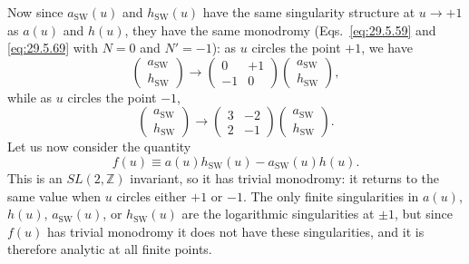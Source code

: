Now since \(a_{\mathrm{SW}}(u)\) and \(h_{\mathrm{SW}}(u)\) have the same
singularity structure at \(u\longrightarrow+1\) as \(a(u)\) and \(h(u)\),
they have the same monodromy (Eqs.~\eqref{eq:29.5.59} and
\eqref{eq:29.5.69} with \(N=0\) and \(N'=-1\)): as \(u\) circles the point
\(+1\), we have
\begin{equation}
  \begin{pmatrix}
    a_{\mathrm{SW}}\\ h_{\mathrm{SW}}
  \end{pmatrix}
  \longrightarrow
  \begin{pmatrix}
    0&+1\\ -1&0
  \end{pmatrix}
  \begin{pmatrix}
    a_{\mathrm{SW}}\\ h_{\mathrm{SW}}
  \end{pmatrix},
  \tag{29.5.81}\label{eq:29.5.81}
\end{equation}
while as \(u\) circles the point \(-1\),
\begin{equation}
  \begin{pmatrix}
    a_{\mathrm{SW}}\\ h_{\mathrm{SW}}
  \end{pmatrix}
  \longrightarrow
  \begin{pmatrix}
    3&-2\\ 2&-1
  \end{pmatrix}
  \begin{pmatrix}
    a_{\mathrm{SW}}\\ h_{\mathrm{SW}}
  \end{pmatrix}.
  \tag{29.5.82}\label{eq:29.5.82}
\end{equation}
Let us now consider the quantity
\begin{equation}
  f(u)\equiv a(u)h_{\mathrm{SW}}(u)-a_{\mathrm{SW}}(u)h(u).
  \tag{29.5.83}\label{eq:29.5.83}
\end{equation}
This is an \(SL(2,\mathbb{Z})\) invariant, so it has trivial monodromy: it
returns to the same value when \(u\) circles either \(+1\) or \(-1\). The
only finite singularities in \(a(u)\), \(h(u)\), \(a_{\mathrm{SW}}(u)\), or
\(h_{\mathrm{SW}}(u)\) are the logarithmic singularities at \(\pm1\), but
since \(f(u)\) has trivial monodromy it does not have these singularities,
and it is therefore analytic at all finite points.

